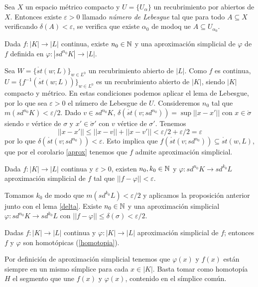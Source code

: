 \documentclass[HS.tex]{subfiles}
\begin{document}
\begin{lemma}[de Lebesgue]
Sea $X$ un espacio métrico compacto y $U=\{U_\alpha\}$ un recubrimiento por abiertos de $X$. Entonces existe $\varepsilon>0$ llamado \emph{número de Lebesgue} tal que para todo $A\subseteq X$ verificando $\delta(A)<\varepsilon$, se verifica que existe $\alpha_0$ de modoq ue $A\subseteq U_{\alpha_0}$.
\end{lemma}

\begin{prop}
Dada $f:|K|\to |L|$ continua, existe $n_0\in\mathbb{N}$ y una aproximación simplicial de $\varphi$ de $f$ definida en $\varphi:|sd^{n_0}K|\to |L|$. 
\end{prop}
\begin{dem}
Sea $W=\{\mathring{st}(w;L)\}_{w\in L^0}$ un recubrimiento abierto de $|L|$. Como $f$ es continua, $U=\{f^{-1}(\mathring{st}(w;L))\}_{w\in L^0}$ es un recubrimiento abierto de $|K|$, siendo $|K|$ compacto y métrico. En estas condiciones podemos aplicar el lema de Lebesgue, por lo que sea $\varepsilon>0$ el número de Lebesgue de $U$. Consideremos $n_0$ tal que $m(sd^{n_0}K)<\varepsilon/2$. Dado $v\in sd^{n_0}K$, $\delta(\mathring{st}(v; sd^{n_0}))=\sup ||x-x'||$ con $x\in\mathring{\sigma}$ siendo $v$ vértice de $\sigma$ y $x'\in \mathring{\sigma}'$ con $v$ vértice de $\sigma'$. Tenemos
\[
||x-x'||\leq ||x-v||+||x-v'||<\varepsilon/2+\varepsilon/2=\varepsilon
\]
por lo que $\delta(\mathring{st}(v; sd^{n_0}))<\varepsilon$. Esto implica que $f(\mathring{st}(v; sd^{n_0}))\subseteq\mathring{st}(w,L)$, que por el corolario \ref{aprox} tenemos que $f$ admite aproximación simplicial. 
\QED
\end{dem}

\begin{coro}
Dada $f:|K|\to|L|$ continua y $\varepsilon>0$, existen $n_0,k_0\in\mathbb{N}$ y $\varphi:sd^{n_0}K\to sd^{k_0}L$ aproximación simplicial de $f$ tal que $||f-\varphi||<\varepsilon$.
\end{coro}
\begin{dem}
Tomamos $k_0$ de modo que $m(sd^{k_0}L)<\varepsilon/2$ y aplicamos la proposición anterior junto con el lema \ref{delta}. Existe $n_0\in\mathbb{N}$ y una aproximación simplicial $\varphi:sd^{n_0}K\to sd^{k_0}L$ con $||f-\varphi||\leq \delta(\sigma)<\varepsilon/2$. \QED
\end{dem}

\begin{prop}
Dadas $f:|K|\to|L|$ continua y $\varphi:|K|\to |L|$ aproximación simplicial de $f$; entonces $f$ y $\varphi$ son homotópicas (\ref{homotopia}).
\end{prop}
\begin{dem}
Por definición de aproximación simplicial tenemos que $\varphi(x)$ y $f(x)$ están siempre en un mismo símplice para cada $x\in|K|$. Basta tomar como homotopía $H$ el segmento que une $f(x)$ y $\varphi(x)$, contenido en el símplice común. 
\QED
\end{dem}
\end{document}
